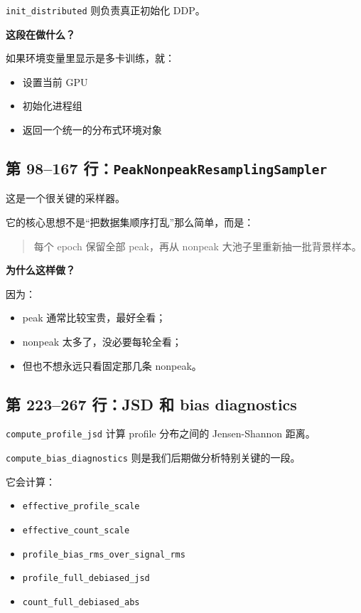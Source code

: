\documentclass[11pt,a4paper]{ctexart}
\begin{document}
\texttt{init\_distributed} 则负责真正初始化 DDP。

\textbf{这段在做什么？}

如果环境变量里显示是多卡训练，就：

\begin{itemize}[leftmargin=2em]
\item 设置当前 GPU
\item 初始化进程组
\item 返回一个统一的分布式环境对象
\end{itemize}

\subsection{第 98--167 行：\texttt{PeakNonpeakResamplingSampler}}

这是一个很关键的采样器。

它的核心思想不是“把数据集顺序打乱”那么简单，而是：

\begin{quote}
每个 epoch 保留全部 peak，再从 nonpeak 大池子里重新抽一批背景样本。
\end{quote}

\textbf{为什么这样做？}

因为：

\begin{itemize}[leftmargin=2em]
\item peak 通常比较宝贵，最好全看；
\item nonpeak 太多了，没必要每轮全看；
\item 但也不想永远只看固定那几条 nonpeak。
\end{itemize}

\subsection{第 223--267 行：JSD 和 bias diagnostics}

\texttt{compute\_profile\_jsd} 计算 profile 分布之间的 Jensen-Shannon 距离。

\texttt{compute\_bias\_diagnostics} 则是我们后期做分析特别关键的一段。

它会计算：

\begin{itemize}[leftmargin=2em]
\item \texttt{effective\_profile\_scale}
\item \texttt{effective\_count\_scale}
\item \texttt{profile\_bias\_rms\_over\_signal\_rms}
\item \texttt{profile\_full\_debiased\_jsd}
\item \texttt{count\_full\_debiased\_abs}
\end{itemize}
\end{document}
